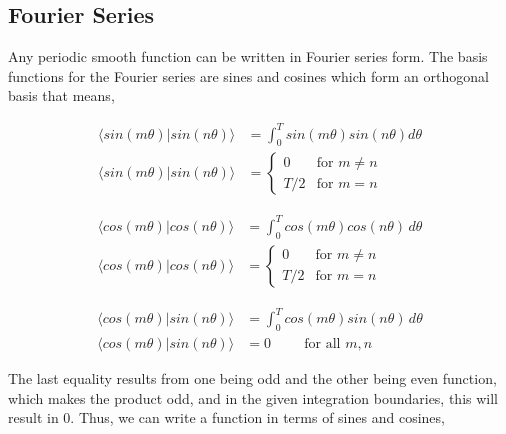 \subsection{Fourier Series}

Any periodic smooth function can be written in Fourier series form. The basis functions for the Fourier series are sines and cosines which form an orthogonal basis that means,\\
\begin{minipage}{0.49 \textwidth}
    \begin{align}
        \langle sin(m\theta) | sin(n\theta)\rangle &= \int_{0}^{T} sin(m\theta)sin(n\theta) d\theta \\[.3cm]
        \langle sin(m\theta) | sin(n\theta)\rangle &= \begin{cases}
            0         & \text{for } m \neq n \\[.3cm]
            T/2        & \text{for } m = n
        \end{cases}
    \end{align} 
\end{minipage}
\begin{minipage}{0.49 \textwidth}
    \begin{align}
            \langle cos(m\theta) | cos(n\theta)\rangle &= \int_{0}^{T} cos(m\theta)cos(n\theta) \,d\theta \\[.3cm]
            \langle cos(m\theta) | cos(n\theta)\rangle &= \begin{cases}
                0         & \text{for } m \neq n \\[.3cm]
                T/2        & \text{for } m = n
            \end{cases}
    \end{align}
\end{minipage}

\begin{align}
        \langle cos(m\theta) | sin(n\theta) \rangle &= \int_{0}^{T} cos(m\theta)sin(n\theta) \,d\theta \\[.3cm]
        \langle cos(m\theta) | sin(n\theta) \rangle &= 0 \hspace{1cm}\text{for all } m,n
\end{align} 

The last equality results from one being odd and the other being even function, which makes the product odd, and in the given integration boundaries, this will result in 0. Thus, we can write a function in terms of sines and cosines,

